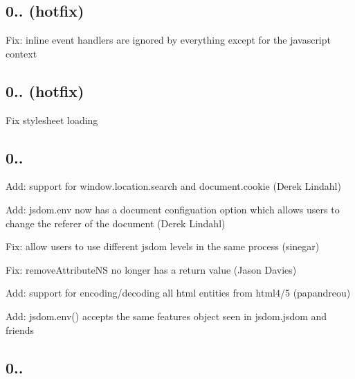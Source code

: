 \subsection*{0.. (hotfix)}


\begin{DoxyItemize}
\item Fix\+: inline event handlers are ignored by everything except for the javascript context
\end{DoxyItemize}

\subsection*{0.. (hotfix)}


\begin{DoxyItemize}
\item Fix stylesheet loading
\end{DoxyItemize}

\subsection*{0..}


\begin{DoxyItemize}
\item Add\+: support for window.\+location.\+search and document.\+cookie (Derek Lindahl)
\item Add\+: jsdom.\+env now has a document configuation option which allows users to change the referer of the document (Derek Lindahl)
\item Fix\+: allow users to use different jsdom levels in the same process (sinegar)
\item Fix\+: remove\+Attribute\+NS no longer has a return value (Jason Davies)
\item Add\+: support for encoding/decoding all html entities from html4/5 (papandreou)
\item Add\+: jsdom.\+env() accepts the same features object seen in jsdom.\+jsdom and friends
\end{DoxyItemize}

\subsection*{0..}


